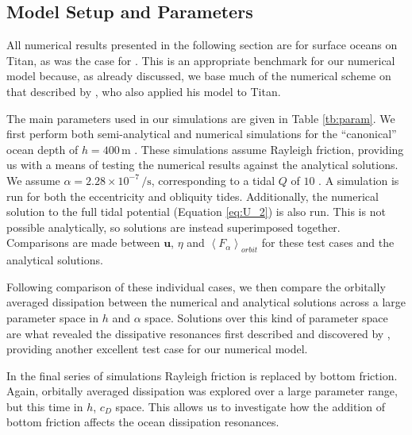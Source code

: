 \subsection{Model Setup and Parameters \label{subsec:param}}



All numerical results presented in the following section are for surface oceans on Titan, as was the case for \citet{sears1995tidal,sohl1995tidal}. This is an appropriate benchmark for our numerical model because, as already discussed, we base much of the numerical scheme on that described by \citet{sears1995tidal}, who also applied his model to Titan.

The main parameters used in our simulations are given in Table \ref{tb:param}. We first perform both semi-analytical and numerical simulations for the ``canonical'' ocean depth of $h=400 \, \si{\metre}$ \citep{sagan1982tide,sears1995tidal}. These simulations assume Rayleigh friction, providing us with a means of testing the numerical results against the analytical solutions. We assume \hbox{$\alpha = 2.28 \times 10^{-7} \, \si{\per\second}$}, corresponding to a tidal $Q$ of $10$ \citep{tyler2011tidal}. A simulation is run for both the eccentricity and obliquity tides. Additionally, the numerical solution to the full tidal potential (Equation \ref{eq:U_2}) is also run. This is not possible analytically, so solutions are instead superimposed together. Comparisons are made between $\bm{u}$, $\eta$ and $\left\langle F_\alpha \right\rangle_{orbit}$ for these test cases and the analytical solutions. 

Following comparison of these individual cases, we then compare the orbitally averaged dissipation between the numerical and analytical solutions across a large parameter space in $h$ and $\alpha$ space. Solutions over this kind of parameter space are what revealed the dissipative resonances first described and discovered by \citet{tyler2011tidal}, providing another excellent test case for our numerical model.



In the final series of simulations Rayleigh friction is replaced by bottom friction. Again, orbitally averaged dissipation was explored over a large parameter range, but this time in $h$, $c_D$ space. This allows us to investigate how the addition of bottom friction affects the ocean dissipation resonances. 
